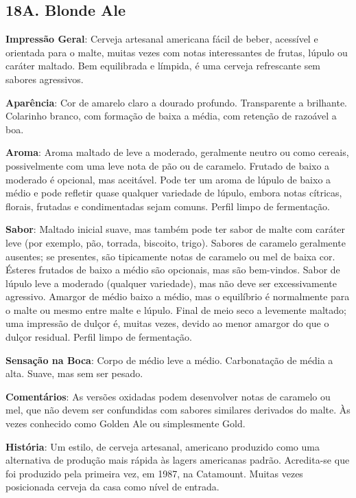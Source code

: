 \subsection*{18A. Blonde Ale}
\textbf{Impressão Geral}: Cerveja artesanal americana fácil de beber, acessível e orientada para o malte, muitas vezes com notas interessantes de frutas, lúpulo ou caráter maltado. Bem equilibrada e límpida, é uma cerveja refrescante sem sabores agressivos.

\textbf{Aparência}: Cor de amarelo claro a dourado profundo. Transparente a brilhante. Colarinho branco, com formação de baixa a média, com retenção de razoável a boa.

\textbf{Aroma}: Aroma maltado de leve a moderado, geralmente neutro ou como cereais, possivelmente com uma leve nota de pão ou de caramelo. Frutado de baixo a moderado é opcional, mas aceitável. Pode ter um aroma de lúpulo de baixo a médio e pode refletir quase qualquer variedade de lúpulo, embora notas cítricas, florais, frutadas e condimentadas sejam comuns. Perfil limpo de fermentação.

\textbf{Sabor}: Maltado inicial suave, mas também pode ter sabor de malte com caráter leve (por exemplo, pão, torrada, biscoito, trigo). Sabores de caramelo geralmente ausentes; se presentes, são tipicamente notas de caramelo ou mel de baixa cor. Ésteres frutados de baixo a médio são opcionais, mas são bem-vindos. Sabor de lúpulo leve a moderado (qualquer variedade), mas não deve ser excessivamente agressivo. Amargor de médio baixo a médio, mas o equilíbrio é normalmente para o malte ou mesmo entre malte e lúpulo. Final de meio seco a levemente maltado; uma impressão de dulçor é, muitas vezes, devido ao menor amargor do que o dulçor residual. Perfil limpo de fermentação.

\textbf{Sensação na Boca}: Corpo de médio leve a médio. Carbonatação de média a alta. Suave, mas sem ser pesado.

\textbf{Comentários}: As versões oxidadas podem desenvolver notas de caramelo ou mel, que não devem ser confundidas com sabores similares derivados do malte. Às vezes conhecido como Golden Ale ou simplesmente Gold.

\textbf{História}: Um estilo, de cerveja artesanal, americano produzido como uma alternativa de produção mais rápida às lagers americanas padrão. Acredita-se que foi produzido pela primeira vez, em 1987, na Catamount. Muitas vezes posicionada cerveja da casa como nível de entrada.

